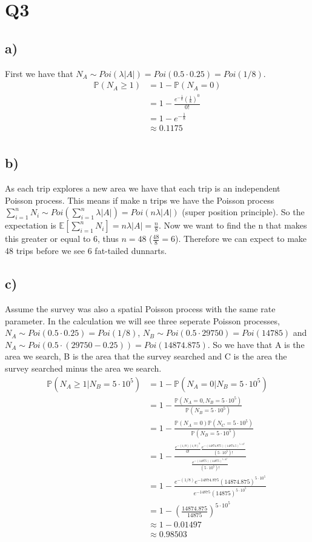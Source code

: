 \documentclass{article}
\begin{document}
\section*{Q3}
\subsection*{a)}
First we have that $N_A\sim Poi(\lambda|A|)=Poi(0.5\cdot0.25)=Poi(1/8)$.
\begin{align*}
\mathbb{P}(N_A\geq1)&=1-\mathbb{P}(N_A=0)\\
&=1-\frac{e^{-\frac{1}{8}}\left(\frac{1}{8}\right)^0}{0!}\\
&=1-e^{-\frac{1}{8}}\\
&\approx 0.1175\\
\end{align*}
\subsection*{b)}
As each trip explores a new area we have that each trip is an independent Poisson process. This means if make n trips we have the Poisson process $\sum_{i=1}^{n}N_{i}\sim Poi(\sum_{i=1}^{n}\lambda|A|)=Poi(n\lambda|A|)$ (super position principle). So the expectation is $\mathbb{E}[\sum_{i=1}^{n}N_{i}]=n\lambda|A|=\frac{n}{8}$. Now we want to find the n that makes this greater or equal to 6, thus $n=48$ ($\frac{48}{8}=6$). Therefore we can expect to make 48 trips before we see 6 fat-tailed dunnarts. 
\subsection*{c)}
Assume the survey was also a spatial Poisson process with the same rate parameter. In the calculation we will see three seperate Poisson processes, $N_A\sim Poi(0.5\cdot0.25)=Poi(1/8)$, $N_B\sim Poi(0.5\cdot29750)=Poi(14785)$ and $N_A\sim Poi(0.5\cdot(29750-0.25))=Poi(14874.875)$. So we have that A is the area we search, B is the area that the survey searched and C is the area the survey searched minus the area we search.
\begin{align*}
\mathbb{P}(N_{A}\geq1|N_B=5\cdot10^5)&=1-\mathbb{P}(N_{A}=0|N_B=5\cdot10^5)\\
&=1-\frac{\mathbb{P}(N_{A}=0,N_B=5\cdot10^5)}{\mathbb{P}(N_B=5\cdot10^5)}\\
&=1-\frac{\mathbb{P}(N_{A}=0)\mathbb{P}(N_C=5\cdot10^5)}{\mathbb{P}(N_B=5\cdot10^5)}\\
&=1-\frac{\frac{e^{-(1/8)(1/8)^{0}}}{0!}\frac{e^{-(14874.875)(14874.5)^{5\cdot10^5}}}{(5\cdot10^5)!}}{\frac{e^{-(14875)(14875)^{5\cdot10^5}}}{(5\cdot10^5)!}}\\
&=1-\frac{e^{-(1/8)}e^{-14874.875}(14874.875)^{5\cdot10^{5}}}{e^{-14875}(14875)^{5\cdot10^{5}}}\\
&=1-\left(\frac{14874.875}{14875}\right)^{5\cdot10^{5}}\\
&\approx1-0.01497\\
&\approx0.98503\\
\end{align*}
\end{document}
